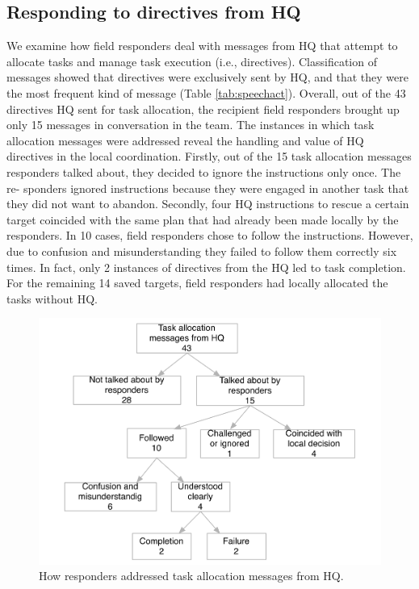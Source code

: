 \subsection{Responding to directives from HQ}\label{sec:study1directives}

We examine how field responders deal with messages from HQ that attempt to allocate tasks and manage task execution (i.e., directives). Classification of messages showed that directives were exclusively sent by HQ, and that they were the most frequent kind of message (Table \ref{tab:speechact}). Overall, out of the 43 directives HQ sent for task allocation, the recipient field responders brought up only 15 messages in conversation in the team. The instances in which task allocation messages were addressed reveal the handling and value of HQ directives in the local coordination. Firstly, out of the 15 task allocation messages responders talked about, they decided to ignore the instructions only once. The re- sponders ignored instructions because they were engaged in another task that they did not want to abandon. Secondly, four HQ instructions to rescue a certain target coincided with the same plan that had already been made locally by the responders. In 10 cases, field responders chose to follow the instructions. However, due to confusion and misunderstanding they failed to follow them correctly six times. In fact, only 2 instances of directives from the HQ led to task completion. For the remaining 14 saved targets, field responders had locally allocated the tasks without HQ.\\

\begin{figure}[h]
  \centering
  \includegraphics[width=1\textwidth]{img/study1/instructions}
  \caption{How responders addressed task allocation messages from HQ.}
  \label{fig:instructions}
\end{figure}

